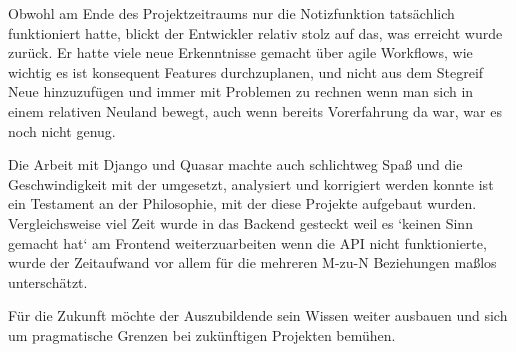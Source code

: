 Obwohl am Ende des Projektzeitraums nur die Notizfunktion tatsächlich funktioniert hatte, blickt der Entwickler relativ stolz auf das,
was erreicht wurde zurück. Er hatte viele neue Erkenntnisse gemacht über agile Workflows, wie wichtig es ist konsequent Features durchzuplanen,
und nicht aus dem Stegreif Neue hinzuzufügen und immer mit Problemen zu rechnen wenn man sich in einem relativen Neuland bewegt, auch wenn bereits
Vorerfahrung da war, war es noch nicht genug.

\bigskip\noindent
Die Arbeit mit Django und Quasar machte auch schlichtweg Spaß und die Geschwindigkeit mit der umgesetzt, analysiert und korrigiert werden konnte
ist ein Testament an der Philosophie, mit der diese Projekte aufgebaut wurden. Vergleichsweise viel Zeit wurde in das Backend gesteckt weil es
`keinen Sinn gemacht hat` am Frontend weiterzuarbeiten wenn die API nicht funktionierte, wurde der Zeitaufwand vor allem für die mehreren M-zu-N Beziehungen
maßlos unterschätzt.

\bigskip\noindent
Für die Zukunft möchte der Auszubildende sein Wissen weiter ausbauen und sich um pragmatische Grenzen bei zukünftigen Projekten bemühen.